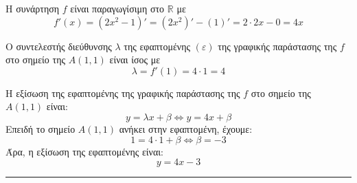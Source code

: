 \begin{alist}
\item Η συνάρτηση $f$ είναι παραγωγίσιμη στο $\mathbb{R}$ με
\[ f'(x) = (2x^2 - 1)' = (2x^2)' - (1)' = 2 \cdot 2x - 0 = 4x \]
\item Ο συντελεστής διεύθυνσης $\lambda$ της εφαπτομένης $(\varepsilon)$ της γραφικής παράστασης της $f$ στο σημείο της $A(1,1)$ είναι ίσος με
\[ \lambda = f'(1) = 4 \cdot 1 = 4 \]
\item Η εξίσωση της εφαπτομένης της γραφικής παράστασης της $f$ στο σημείο της $A(1,1)$ είναι:
\[ y = \lambda x + \beta \Leftrightarrow y = 4x + \beta \]
Επειδή το σημείο $A(1,1)$ ανήκει στην εφαπτομένη, έχουμε:
\[ 1 = 4 \cdot 1 + \beta \Leftrightarrow \beta = -3 \]
Άρα, η εξίσωση της εφαπτομένης είναι:
\[ y = 4x - 3 \]
\end{alist}
\vspace{6mm}
\noindent\rule{\textwidth}{0.4pt}
\vspace{6mm}

